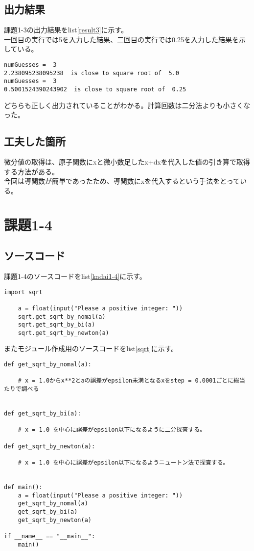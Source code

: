 \documentclass{ltjsarticle}
\begin{document}
\subsection*{出力結果}
課題1-3の出力結果をlist\ref{result3}に示す。
\\一回目の実行では5を入力した結果、二回目の実行では0.25を入力した結果を示している。
\begin{lstlisting}[caption=output, label=result3]
numGuesses =  3
2.238095238095238  is close to square root of  5.0
numGuesses =  3
0.5001524390243902  is close to square root of  0.25
\end{lstlisting}
どちらも正しく出力されていることがわかる。計算回数は二分法よりも小さくなった。

\subsection*{工夫した箇所}
微分値の取得は、原子関数にxと微小数足したx+dxを代入した値の引き算で取得する方法がある。
\\今回は導関数が簡単であったため、導関数にxを代入するという手法をとっている。
\newpage

\section*{課題1-4}
\subsection*{ソースコード}
課題1-4のソースコードをlist\ref{kadai1-4}に示す。
\begin{lstlisting}[caption=kadai1-4.py,label=kadai1-4]
    import sqrt

    a = float(input("Please a positive integer: "))
    sqrt.get_sqrt_by_nomal(a)
    sqrt.get_sqrt_by_bi(a)
    sqrt.get_sqrt_by_newton(a)
\end{lstlisting}
またモジュール作成用のソースコードをlist\ref{sqrt}に示す。
\begin{lstlisting}[caption=sqrt.py,label=sqrt]
def get_sqrt_by_nomal(a):

    # x = 1.0からx**2とaの誤差がepsilon未満となるxをstep = 0.0001ごとに総当たりで調べる


def get_sqrt_by_bi(a):

    # x = 1.0 を中心に誤差がepsilon以下になるように二分探査する。

def get_sqrt_by_newton(a):

    # x = 1.0 を中心に誤差がepsilon以下になるようニュートン法で探査する。


def main():
    a = float(input("Please a positive integer: "))
    get_sqrt_by_nomal(a)
    get_sqrt_by_bi(a)
    get_sqrt_by_newton(a)

if __name__ == "__main__":
    main()
\end{lstlisting}
\newpage
\end{document}
